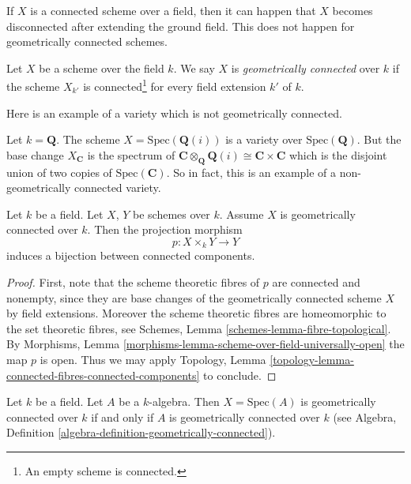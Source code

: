 \noindent
If $X$ is a connected scheme over a field, then it can happen that $X$
becomes disconnected after extending the ground field. This does not happen
for geometrically connected schemes.

\begin{definition}
\label{definition-geometrically-connected}
Let $X$ be a scheme over the field $k$.
We say $X$ is {\it geometrically connected} over $k$
if the scheme $X_{k'}$ is connected\footnote{An empty scheme is connected.}
for every field extension $k'$ of $k$.
\end{definition}

\noindent
Here is an example of a variety which is not geometrically connected.

\begin{example}
\label{example-not-geometrically-irreducible}
Let $k = \mathbf{Q}$. The scheme
$X = \text{Spec}(\mathbf{Q}(i))$ is a variety over $\text{Spec}(\mathbf{Q})$.
But the base change $X_{\mathbf{C}}$ is the spectrum of
$\mathbf{C} \otimes_{\mathbf{Q}} \mathbf{Q}(i) \cong
\mathbf{C} \times \mathbf{C}$ which is the disjoint union of
two copies of $\text{Spec}(\mathbf{C})$. So in fact, this is an
example of a non-geometrically connected variety.
\end{example}

\begin{lemma}
\label{lemma-bijection-connected-components}
Let $k$ be a field.
Let $X$, $Y$ be schemes over $k$.
Assume $X$ is geometrically connected over $k$.
Then the projection morphism
$$
p : X \times_k Y \longrightarrow Y
$$
induces a bijection between connected components.
\end{lemma}

\begin{proof}
First, note that the scheme theoretic fibres of $p$ are connected
and nonempty, since they
are base changes of the geometrically connected scheme $X$ by
field extensions. Moreover the scheme theoretic fibres are
homeomorphic to the set theoretic fibres, see
Schemes, Lemma \ref{schemes-lemma-fibre-topological}.
By Morphisms, Lemma \ref{morphisms-lemma-scheme-over-field-universally-open}
the map $p$ is open.
Thus we may apply Topology,
Lemma \ref{topology-lemma-connected-fibres-connected-components}
to conclude.
\end{proof}

\begin{lemma}
\label{lemma-affine-geometrically-connected}
Let $k$ be a field.
Let $A$ be a $k$-algebra.
Then $X = \text{Spec}(A)$ is geometrically connected over $k$
if and only if $A$ is geometrically connected over $k$ (see
Algebra, Definition \ref{algebra-definition-geometrically-connected}).
\end{lemma}


